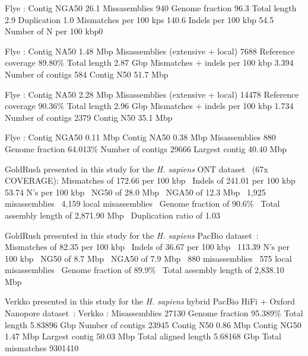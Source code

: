 \documentclass[12pt, letterpaper]{article}
\begin{document}
Flye \cite{Wong2023}:
Contig NGA50 26.1 \cite{Wong2023}
Missasemblies 940 \cite{Wong2023}
Genome fraction 96.3 \cite{Wong2023}
Total length 2.9  \cite{Wong2023}
Duplication 1.0 \cite{Wong2023}
Mismatches per 100 kps 140.6 \cite{Wong2023}
Indels per 100 kbp 54.5 \cite{Wong2023}
Number of N per 100 kbp0 \cite{Wong2023}

Flye \cite{Chen2021}:
Contig NA50 1.48 Mbp \cite{Chen2021}
Misassemblies (extensive + local) 7688 \cite{Chen2021}
Reference coverage 89.80\% \cite{Chen2021}
Total length 2.87 Gbp \cite{Chen2021}
Mismatches + indels per 100 kbp 3.394 \cite{Chen2021}
Number of contigs 584 \cite{Chen2021}
Contig N50 51.7 Mbp \cite{Chen2021}

Flye \cite{Chen2021}:
Contig NA50 2.28 Mbp \cite{Chen2021}
Misassemblies (extensive + local) 14478 \cite{Chen2021}
Reference coverage 90.36\% \cite{Chen2021}
Total length 2.96 Gbp \cite{Chen2021}
Mismatches + indels per 100 kbp 1.734 \cite{Chen2021}
Number of contigs 2379 \cite{Chen2021}
Contig N50 35.1 Mbp \cite{Chen2021}

Flye \cite{GTasm2024}:
Contig NGA50 0.11 Mbp \cite{GTasm2024}
Contig NA50 0.38 Mbp \cite{GTasm2024}
Misassemblies 880 \cite{GTasm2024}
Genome fraction 64.013\% \cite{GTasm2024}
Number of contigs 29666 \cite{GTasm2024}
Largest contig 40.40 Mbp \cite{GTasm2024}


GoldRush presented in this study for the \textit{H. sapiens} ONT dataset~\cite{Kazemi2026} (67x COVERAGE):
Mismatches of 172.66 per 100 kbp~\cite{Kazemi2026}
Indels of 241.01 per 100 kbp~\cite{Kazemi2026}
53.74 N's per 100 kbp~\cite{Kazemi2026}
NG50 of 28.0 Mbp~\cite{Kazemi2026}
NGA50 of 12.3 Mbp~\cite{Kazemi2026}
1,925 misassemblies~\cite{Kazemi2026}
4,159 local misassemblies~\cite{Kazemi2026}
Genome fraction of 90.6\%~\cite{Kazemi2026}
Total assembly length of 2,871.90 Mbp~\cite{Kazemi2026}
Duplication ratio of 1.03~\cite{Kazemi2026}

GoldRush presented in this study for the \textit{H. sapiens} PacBio dataset~\cite{Kazemi2026}:
Mismatches of 82.35 per 100 kbp~\cite{Kazemi2026}
Indels of 36.67 per 100 kbp~\cite{Kazemi2026}
113.39 N's per 100 kbp~\cite{Kazemi2026}
NG50 of 8.7 Mbp~\cite{Kazemi2026}
NGA50 of 7.9 Mbp~\cite{Kazemi2026}
880 misassemblies~\cite{Kazemi2026}
575 local misassemblies~\cite{Kazemi2026}
Genome fraction of 89.9\%~\cite{Kazemi2026}
Total assembly length of 2,838.10 Mbp~\cite{Kazemi2026}

Verkko presented in this study for the \textit{H. sapiens} hybrid
PacBio HiFi + Oxford Nanopore dataset~\cite{Espinosa2023}:
Verkko \cite{Espinosa2023}:
Misassemblies 27130 \cite{Espinosa2023}
Genome fraction 95.389\% \cite{Espinosa2023}
Total length 5.83896 Gbp \cite{Espinosa2023}
Number of contigs 23945 \cite{Espinosa2023}
Contig N50 0.86 Mbp \cite{Espinosa2023}
Contig NG50 1.47 Mbp \cite{Espinosa2023}
Largest contig 50.03 Mbp \cite{Espinosa2023}
Total aligned length 5.68168 Gbp \cite{Espinosa2023}
Total mismatches 9301410 \cite{Espinosa2023}
\end{document}
